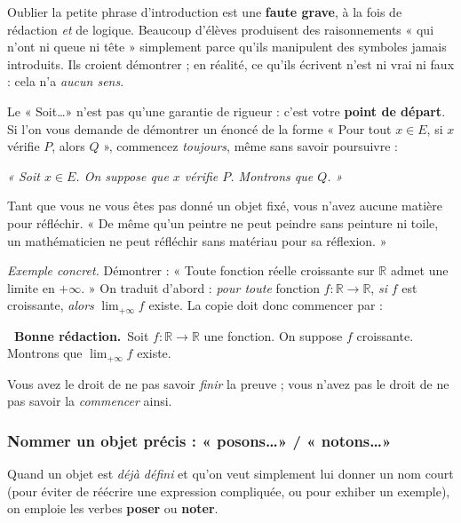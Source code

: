\documentclass[11pt,a4paper]{article}
\newcommand{\ok}{\textcolor{METeal}{\textbf{\ding{51}\ \sffamily Bonne rédaction.}}\ }
\newcommand{\R}{\mathbb{R}}
\newcommand{\ra}{\longrightarrow}
\begin{document}
\begin{attention}
Oublier la petite phrase d'introduction est une \textbf{faute grave}, à la fois de rédaction
\emph{et} de logique. Beaucoup d'élèves produisent des raisonnements « qui n'ont ni queue ni
tête » simplement parce qu'ils manipulent des symboles jamais introduits. Ils croient
démontrer ; en réalité, ce qu'ils écrivent n'est ni vrai ni faux : cela n'a \emph{aucun sens}.
\end{attention}

\begin{astuce}
Le « Soit\dots » n'est pas qu'une garantie de rigueur : c'est votre \textbf{point de départ}.
Si l'on vous demande de démontrer un énoncé de la forme « Pour tout $x\in E$, si $x$ vérifie
$P$, alors $Q$ », commencez \emph{toujours}, même sans savoir poursuivre :
\begin{center}\itshape
« Soit $x\in E$. On suppose que $x$ vérifie $P$. Montrons que $Q$. »
\end{center}
Tant que vous ne vous êtes pas donné un objet fixé, vous n'avez aucune matière pour réfléchir.
« De même qu'un peintre ne peut peindre sans peinture ni toile, un mathématicien ne peut
réfléchir sans matériau pour sa réflexion. »
\end{astuce}

\emph{Exemple concret.} Démontrer : « Toute fonction réelle croissante sur $\R$ admet une
limite en $+\infty$. » On traduit d'abord : \emph{pour toute} fonction $f:\R\ra\R$, \emph{si}
$f$ est croissante, \emph{alors} $\lim_{+\infty} f$ existe. La copie doit donc commencer par :
\begin{bonne}
\ok Soit $f:\R\ra\R$ une fonction. On suppose $f$ croissante. Montrons que $\lim_{+\infty}f$
existe.
\end{bonne}
Vous avez le droit de ne pas savoir \emph{finir} la preuve ; vous n'avez pas le droit de ne
pas savoir la \emph{commencer} ainsi.

\subsubsection{Nommer un objet précis : « posons\dots » / « notons\dots »}

Quand un objet est \emph{déjà défini} et qu'on veut simplement lui donner un nom court
(pour éviter de réécrire une expression compliquée, ou pour exhiber un exemple), on emploie
les verbes \textbf{poser} ou \textbf{noter}.
\end{document}
